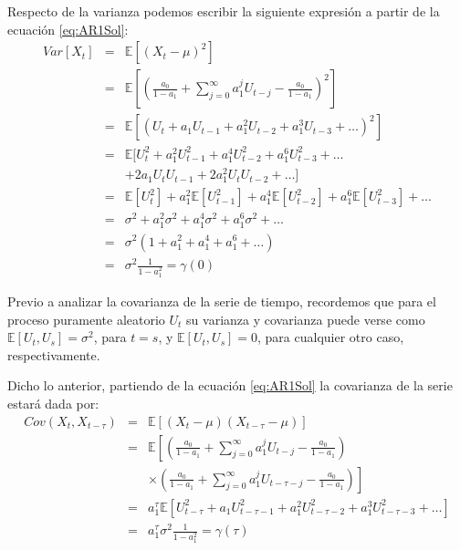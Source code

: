 \documentclass[
]{book}
\begin{document}
Respecto de la varianza podemos escribir la siguiente expresión a partir de la ecuación \eqref{eq:AR1Sol}:
\begin{eqnarray}
    Var[X_t] & = & \mathbb{E}[(X_t - \mu)^2] \nonumber \\
    & = & \mathbb{E} \left[ \left( \frac{a_0}{1 - a_1} + \sum^{\infty}_{j = 0} a_1^j U_{t-j} - \frac{a_0}{1 - a_1} \right)^2 \right] \nonumber \\
    & = & \mathbb{E}[(U_{t} + a_1 U_{t-1} + a_1^2 U_{t-2} + a_1^3 U_{t-3} + \ldots)^2] \nonumber \\
    & = & \mathbb{E}[U^2_{t} + a_1^2 U^2_{t-1} + a_1^4 U^2_{t-2} + a_1^6 U^2_{t-3} + \ldots \nonumber \\
    &   & + 2 a_1 U_t U_{t-1} + 2 a_1^2 U_t U_{t-2} + \ldots] \nonumber \\
    & = & \mathbb{E}[U^2_{t}] + a_1^2 \mathbb{E}[U^2_{t-1}] + a_1^4 \mathbb{E}[U^2_{t-2}] + a_1^6 \mathbb{E}[U^2_{t-3}] + \ldots \nonumber \\
    & = & \sigma^2 + a_1^2 \sigma^2 + a_1^4 \sigma^2 + a_1^6 \sigma^2 + \ldots \nonumber \\
    & = & \sigma^2 (1 + a_1^2 + a_1^4 + a_1^6 + \ldots) \nonumber \\
    & = & \sigma^2 \frac{1}{1 - a_1^2} = \gamma(0)
    \label{eq:AR1Var}
\end{eqnarray}

Previo a analizar la covarianza de la serie de tiempo, recordemos que para el proceso puramente aleatorio \(U_t\) su varianza y covarianza puede verse como \(\mathbb{E}[U_t, U_s] = \sigma^2\), para \(t = s\), y \(\mathbb{E}[U_t, U_s] = 0\), para cualquier otro caso, respectivamente.

Dicho lo anterior, partiendo de la ecuación \eqref{eq:AR1Sol} la covarianza de la serie estará dada por:
\begin{eqnarray}
    Cov(X_t, X_{t-\tau}) & = & \mathbb{E}[(X_t - \mu)(X_{t-\tau} - \mu)] \nonumber \\
    & = & \mathbb{E} \left[ \left( \frac{a_0}{1 - a_1} + \sum^{\infty}_{j = 0} a_1^j U_{t-j} - \frac{a_0}{1 - a_1} \right) \right. \nonumber \\
    &   & \left. \times \left( \frac{a_0}{1 - a_1} + \sum^{\infty}_{j = 0} a_1^j U_{t-\tau-j} - \frac{a_0}{1 - a_1} \right) \right] \nonumber \\
    & = & a_1^{\tau} \mathbb{E}[U^2_{t-\tau} + a_1 U^2_{t-\tau-1} + a_1^2 U^2_{t-\tau-2} + a_1^3 U^2_{t-\tau-3} + \ldots] \nonumber \\
    & = & a_1^{\tau} \sigma^2 \frac{1}{1 - a_1^2} = \gamma(\tau)
    \label{eq:AR1Cov}
\end{eqnarray}
\end{document}
